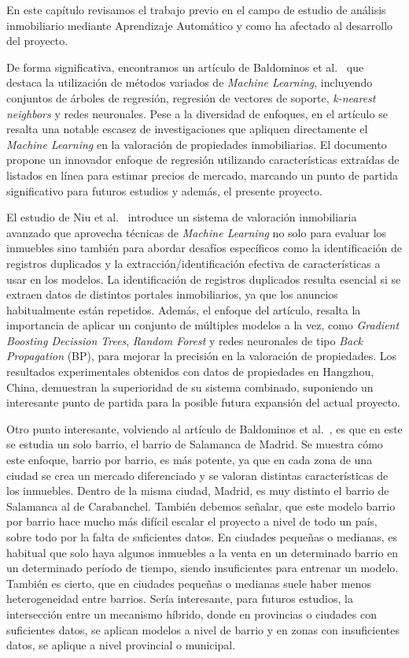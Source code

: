 
En este capítulo revisamos el trabajo previo en el campo de estudio de análisis inmobiliario mediante Aprendizaje Automático y como ha afectado al desarrollo del proyecto.

De forma significativa, encontramos un artículo de Baldominos et al.~\cite{baldominos2018} que destaca la utilización de métodos variados de \textit{Machine Learning}, incluyendo conjuntos de árboles de regresión, regresión de vectores de soporte, \textit{k-nearest neighbors} y redes neuronales. Pese a la diversidad de enfoques, en el artículo se resalta una notable escasez de investigaciones que apliquen directamente el \textit{Machine Learning} en la valoración de propiedades inmobiliarias. El documento propone un innovador enfoque de regresión utilizando características extraídas de listados en línea para estimar precios de mercado, marcando un punto de partida significativo para futuros estudios y además, el presente proyecto. 

El estudio de Niu et al.~\cite{niu2019} introduce un sistema de valoración inmobiliaria avanzado que aprovecha técnicas de \textit{Machine Learning} no solo para evaluar los inmuebles sino también para abordar desafíos específicos como la identificación de registros duplicados y la extracción/identificación efectiva de características a usar en los modelos. La identificación de registros duplicados resulta esencial si se extraen datos de distintos portales inmobiliarios, ya que los anuncios habitualmente están repetidos. Además, el enfoque del artículo, resalta la importancia de aplicar un conjunto de múltiples modelos a la vez, como \textit{Gradient Boosting Decission Trees}, \textit{Random Forest} y redes neuronales de tipo \textit{Back Propagation} (BP), para mejorar la precisión en la valoración de propiedades. Los resultados experimentales obtenidos con datos de propiedades en Hangzhou, China, demuestran la superioridad de su sistema combinado, suponiendo un interesante punto de partida para la posible futura expansión del actual proyecto.

Otro punto interesante, volviendo al artículo de Baldominos et al.~\cite{baldominos2018}, es que en este se estudia un solo barrio, el barrio de Salamanca de Madrid. Se muestra cómo este enfoque, barrio por barrio, es más potente, ya que en cada zona de una ciudad se crea un mercado diferenciado y se valoran distintas características de los inmuebles. Dentro de la misma ciudad, Madrid, es muy distinto el barrio de Salamanca al de Carabanchel. También debemos señalar, que este modelo barrio por barrio hace mucho más difícil escalar el proyecto a nivel de todo un país, sobre todo por la falta de suficientes datos. En ciudades pequeñas o medianas, es habitual que solo haya algunos inmuebles a la venta en un determinado barrio en un determinado período de tiempo, siendo insuficientes para entrenar un modelo. También es cierto, que en ciudades pequeñas o medianas suele haber menos heterogeneidad entre barrios. Sería interesante, para futuros estudios, la intersección entre un mecanismo híbrido, donde en provincias o ciudades con suficientes datos, se aplican modelos a nivel de barrio y en zonas con insuficientes datos, se aplique a nivel provincial o municipal.

